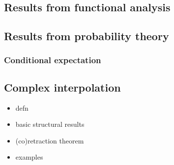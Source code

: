 \subsection{Results from functional analysis}

\subsection{Results from probability theory}

\subsubsection{Conditional expectation}

\subsection{Complex interpolation}

\begin{itemize}
\item defn
\item basic structural results
\item (co)retraction theorem
\item examples 
\end{itemize}


